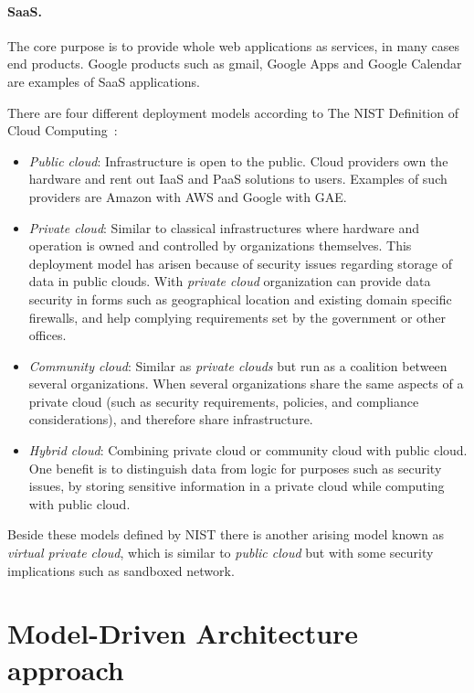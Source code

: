 \paragraph{SaaS.}
The core purpose is to provide whole web applications as services, in many cases end products.
Google products such as gmail, Google Apps and  Google Calendar are examples of 
SaaS applications.

There are four different deployment models according to The 
NIST Definition of Cloud Computing~\cite{nist:mell11}:
\begin{itemize}
  \item \emph{Public cloud}: Infrastructure is open to the public.
    Cloud providers own the hardware and rent out IaaS and PaaS solutions to users.
    Examples of such providers are Amazon with AWS and Google with GAE.
  \item \emph{Private cloud}: Similar to classical infrastructures where hardware and
    operation is owned and controlled by organizations themselves.
    This deployment model has arisen because of security issues regarding storage 
    of data in public clouds. With \emph{private cloud} organization can provide 
    data security in forms such as geographical location and existing domain specific firewalls,
    and help complying requirements set by the government or other offices.
  \item \emph{Community cloud}: Similar as \emph{private clouds} but run as a
    coalition between several organizations.
    When several organizations share the same aspects of
    a private cloud (such as security requirements, policies, and compliance considerations),
    and therefore share infrastructure. 
  \item \emph{Hybrid cloud}: Combining private cloud or community cloud with public cloud.
    One benefit is to distinguish data from logic for purposes such as security issues,
    by storing sensitive information in a private cloud while computing with public cloud.
\end{itemize}

Beside these models defined by NIST there is another arising model known as 
\emph{virtual private cloud}, which is similar to \emph{public cloud} 
but with some security implications such as sandboxed network.

\section{Model-Driven Architecture approach}

